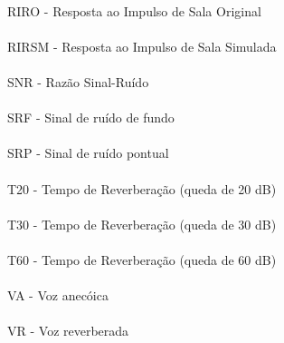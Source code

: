 \paragraph{}RIRO - Resposta ao Impulso de Sala Original
\paragraph{}RIRSM - Resposta ao Impulso de Sala Simulada
\paragraph{}SNR - Razão Sinal-Ruído
\paragraph{}SRF - Sinal de ruído de fundo
\paragraph{}SRP - Sinal de ruído pontual
\paragraph{}T20 - Tempo de Reverberação (queda de 20 dB)
\paragraph{}T30 - Tempo de Reverberação (queda de 30 dB)
\paragraph{}T60 - Tempo de Reverberação (queda de 60 dB)
\paragraph{}VA - Voz anecóica
\paragraph{}VR - Voz reverberada


\pagebreak







